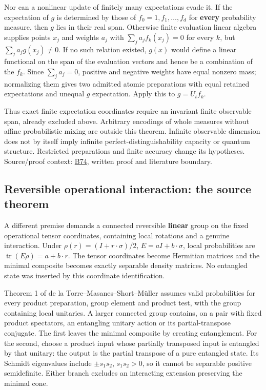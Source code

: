 \documentclass[11pt,a4paper]{article}
\begin{document}
Nor can a nonlinear update of finitely many expectations evade it. If
the expectation of \(g\) is determined by those of
\(f_0=1,f_1,\ldots,f_d\) for \textbf{every} probability measure, then
\(g\) lies in their real span. Otherwise finite evaluation linear
algebra supplies points \(x_j\) and weights \(a_j\) with
\(\sum_ja_jf_k(x_j)=0\) for every \(k\), but \(\sum_ja_jg(x_j)\ne0\). If
no such relation existed, \(g(x)\) would define a linear functional on
the span of the evaluation vectors and hence be a combination of the
\(f_k\). Since \(\sum_ja_j=0\), positive and negative weights have equal
nonzero mass; normalizing them gives two admitted atomic preparations
with equal retained expectations and unequal \(g\) expectation. Apply
this to \(g=U_tf_k\).

Thus exact finite expectation coordinates require an invariant finite
observable span, already excluded above. Arbitrary encodings of whole
measures without affine probabilistic mixing are outside this theorem.
Infinite observable dimension does not by itself imply infinite
perfect-distinguishability capacity or quantum structure. Restricted
preparations and finite accuracy change its hypotheses. Source/proof
context: \href{../references/batches/B74.md}{B74}, written proof and
literature boundary.

\hypertarget{reversible-operational-interaction-the-source-theorem}{%
\subsection{Reversible operational interaction: the source
theorem}\label{reversible-operational-interaction-the-source-theorem}}

A different premise demands a connected reversible \textbf{linear} group
on the fixed operational tensor coordinates, containing local rotations
and a genuine interaction. Under \(\rho(r)=(I+r\cdot\sigma)/2\),
\(E=aI+b\cdot\sigma\), local probabilities are
\(\operatorname{tr}(E\rho)=a+b\cdot r\). The tensor coordinates become
Hermitian matrices and the minimal composite becomes exactly separable
density matrices. No entangled state was inserted by this coordinate
identification.

Theorem 1 of de la Torre--Masanes--Short--Müller assumes valid
probabilities for every product preparation, group element and product
test, with the group containing local unitaries. A larger connected
group contains, on a pair with fixed product spectators, an entangling
unitary action or its partial-transpose conjugate. The first leaves the
minimal composite by creating entanglement. For the second, choose a
product input whose partially transposed input is entangled by that
unitary: the output is the partial transpose of a pure entangled state.
Its Schmidt eigenvalues include \(\pm s_1s_2\), \(s_1s_2>0\), so it
cannot be separable positive semidefinite. Either branch excludes an
interacting extension preserving the minimal cone.
\end{document}
